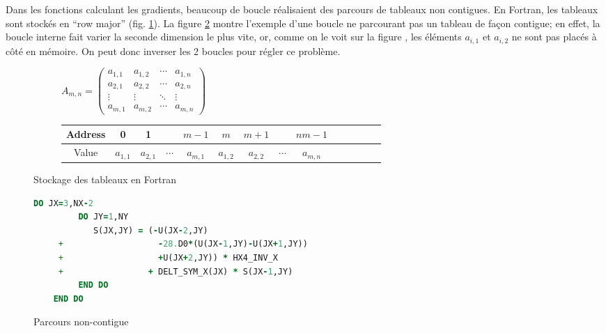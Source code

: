 Dans les fonctions calculant les gradients, beaucoup de boucle réalisaient des parcours de tableaux non contigues. En Fortran, les tableaux sont stockés en ``row major'' (fig. \ref{fig:rowmajor}). La figure \ref{fig:noncontiguous} montre l'exemple d'une boucle ne parcourant pas un tableau de façon contigue; en effet, la boucle interne fait varier la seconde dimension le plus vite, or, comme on le voit sur la figure , les éléments $a_{i,1}$ et $a_{i,2}$ ne sont pas placés à côté en mémoire. On peut donc inverser les 2 boucles pour régler ce problème.

\begin{figure}[ht]
  \centering
  \begin{subfigure}[b]{1\textwidth}
    \centering
    $A_{m,n} = 
    \begin{pmatrix}
      a_{1,1} & a_{1,2} & \cdots & a_{1,n} \\
      a_{2,1} & a_{2,2} & \cdots & a_{2,n} \\
      \vdots  & \vdots  & \ddots & \vdots  \\
      a_{m,1} & a_{m,2} & \cdots & a_{m,n} 
    \end{pmatrix}
    $
  \end{subfigure}
  \vspace{0.6cm}
  
  \begin{subfigure}[b]{1\textwidth}
    \centering
    \begin{tabular}{|c|c|c|c|c|c|c|c|c|c|c|c|c|c|}
      \hline
      Address & 0 & 1  & & $m-1$ & $m$ & $m+1$ &  & $nm-1$ \\
      \hline
      Value & $a_{1,1}$ & $a_{2,1}$ & $\cdots$ & $a_{m,1}$ & $a_{1,2}$ & $a_{2,2}$ & $\cdots$ & $a_{m,n}$ \\
      \hline
      \end{tabular}
  \end{subfigure}
  \caption{\label{fig:rowmajor}Stockage des tableaux en Fortran}
\end{figure}

\begin{figure}[h]
  \centering
  \begin{lstlisting}[language=Fortran]
    DO JX=3,NX-2
         DO JY=1,NY
            S(JX,JY) = (-U(JX-2,JY)
     +                   -28.D0*(U(JX-1,JY)-U(JX+1,JY))
     +                   +U(JX+2,JY)) * HX4_INV_X 
     +                 + DELT_SYM_X(JX) * S(JX-1,JY)
         END DO
    END DO
  \end{lstlisting}
  \caption{\label{fig:noncontiguous}Parcours non-contigue}
\end{figure}



